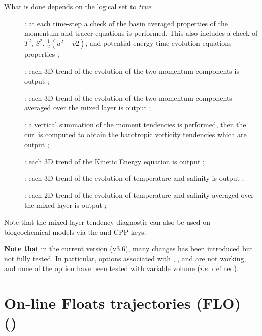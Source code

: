 \documentclass[NEMO_book]{subfiles}
\begin{document}
What is done depends on the  logical set to \textit{true}:
\begin{description}
\item[] : at each  time-step a check of the basin averaged properties 
of the momentum and tracer equations is performed. This also includes a check of $T^2$, $S^2$, 
$\tfrac{1}{2} (u^2+v2)$, and potential energy time evolution equations properties ; 
\item[] : each 3D trend of the evolution of the two momentum components is output ; 
\item[] : each 3D trend of the evolution of the two momentum components averaged 
                           over the mixed layer is output  ; 
\item[] : a vertical summation of the moment tendencies is performed, 
                           then the curl is computed to obtain the barotropic vorticity tendencies which are output ;
\item[]  : each 3D trend of the Kinetic Energy equation is output ;
\item[] : each 3D trend of the evolution of temperature and salinity is output ;
\item[] : each 2D trend of the evolution of temperature and salinity averaged 
                           over the mixed layer is output ;
\end{description}

Note that the mixed layer tendency diagnostic can also be used on biogeochemical models 
via the  and  CPP keys.

\textbf{Note that} in the current version (v3.6), many changes has been introduced but not fully tested. 
In particular, options associated with , , and  
are not working, and none of the option have been tested with variable volume ($i.e.$  defined).


\section{On-line Floats trajectories (FLO) ()}
\label{FLO}
\end{document}
